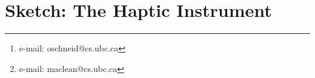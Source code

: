 \chapter{Sketch: The Haptic Instrument}
\label{ch:hapticinstrument}



\author{Oliver S. Schneider\thanks{e-mail: oschneid@cs.ubc.ca} \qquad \qquad Karon E. MacLean\thanks{e-mail: maclean@cs.ubc.ca}\\ %
        \scriptsize Department of Computer Science \\
        \scriptsize University of British Columbia, Vancouver, Canada
}



\newcommand\strongitem[1]{{\textbf{#1.}}}

\newcommand\theme[1]{\subsection{#1}}

\newcommand\q[1]{\textit{``#1"}} 			%
\newcommand\sq[1]{{\q{#1}}}			%
\newcommand\namedquote[2]{{\q{#2} (#1)}}
\newcommand\nq[2]{\namedquote{P#1}{#2}}	%
\newcommand\term[1]{\textit{#1}} 			%





%
% 

